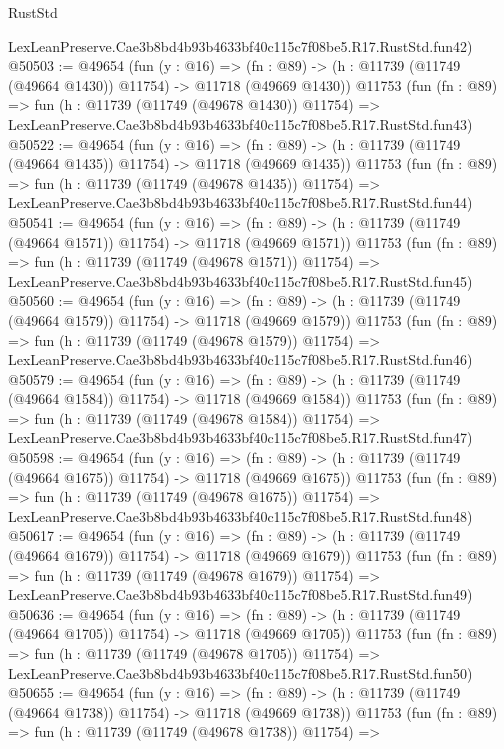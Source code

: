 \begin{lexlean}{RustStd}
\begin{coremodule}
    LexLeanPreserve.Cae3b8bd4b93b4633bf40c115c7f08be5.R17.RustStd.fun42)
@50503 := @49654
    (fun (y : @16) =>
    (fn : @89) -> (h : @11739 (@11749 (@49664 @1430)) @11754) -> @11718 (@49669 @1430))
    @11753
    (fun (fn : @89) =>
    fun (h : @11739 (@11749 (@49678 @1430)) @11754) =>
    LexLeanPreserve.Cae3b8bd4b93b4633bf40c115c7f08be5.R17.RustStd.fun43)
@50522 := @49654
    (fun (y : @16) =>
    (fn : @89) -> (h : @11739 (@11749 (@49664 @1435)) @11754) -> @11718 (@49669 @1435))
    @11753
    (fun (fn : @89) =>
    fun (h : @11739 (@11749 (@49678 @1435)) @11754) =>
    LexLeanPreserve.Cae3b8bd4b93b4633bf40c115c7f08be5.R17.RustStd.fun44)
@50541 := @49654
    (fun (y : @16) =>
    (fn : @89) -> (h : @11739 (@11749 (@49664 @1571)) @11754) -> @11718 (@49669 @1571))
    @11753
    (fun (fn : @89) =>
    fun (h : @11739 (@11749 (@49678 @1571)) @11754) =>
    LexLeanPreserve.Cae3b8bd4b93b4633bf40c115c7f08be5.R17.RustStd.fun45)
@50560 := @49654
    (fun (y : @16) =>
    (fn : @89) -> (h : @11739 (@11749 (@49664 @1579)) @11754) -> @11718 (@49669 @1579))
    @11753
    (fun (fn : @89) =>
    fun (h : @11739 (@11749 (@49678 @1579)) @11754) =>
    LexLeanPreserve.Cae3b8bd4b93b4633bf40c115c7f08be5.R17.RustStd.fun46)
@50579 := @49654
    (fun (y : @16) =>
    (fn : @89) -> (h : @11739 (@11749 (@49664 @1584)) @11754) -> @11718 (@49669 @1584))
    @11753
    (fun (fn : @89) =>
    fun (h : @11739 (@11749 (@49678 @1584)) @11754) =>
    LexLeanPreserve.Cae3b8bd4b93b4633bf40c115c7f08be5.R17.RustStd.fun47)
@50598 := @49654
    (fun (y : @16) =>
    (fn : @89) -> (h : @11739 (@11749 (@49664 @1675)) @11754) -> @11718 (@49669 @1675))
    @11753
    (fun (fn : @89) =>
    fun (h : @11739 (@11749 (@49678 @1675)) @11754) =>
    LexLeanPreserve.Cae3b8bd4b93b4633bf40c115c7f08be5.R17.RustStd.fun48)
@50617 := @49654
    (fun (y : @16) =>
    (fn : @89) -> (h : @11739 (@11749 (@49664 @1679)) @11754) -> @11718 (@49669 @1679))
    @11753
    (fun (fn : @89) =>
    fun (h : @11739 (@11749 (@49678 @1679)) @11754) =>
    LexLeanPreserve.Cae3b8bd4b93b4633bf40c115c7f08be5.R17.RustStd.fun49)
@50636 := @49654
    (fun (y : @16) =>
    (fn : @89) -> (h : @11739 (@11749 (@49664 @1705)) @11754) -> @11718 (@49669 @1705))
    @11753
    (fun (fn : @89) =>
    fun (h : @11739 (@11749 (@49678 @1705)) @11754) =>
    LexLeanPreserve.Cae3b8bd4b93b4633bf40c115c7f08be5.R17.RustStd.fun50)
@50655 := @49654
    (fun (y : @16) =>
    (fn : @89) -> (h : @11739 (@11749 (@49664 @1738)) @11754) -> @11718 (@49669 @1738))
    @11753
    (fun (fn : @89) =>
    fun (h : @11739 (@11749 (@49678 @1738)) @11754) =>

\end{coremodule}
\end{lexlean}
